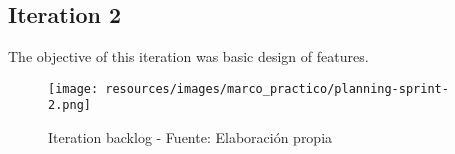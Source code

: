 \subsection{Iteration 2}
The objective of this iteration was basic design of features.

\begin{figure}[H]
    \centering
    \texttt{[image: resources/images/marco\_practico/planning-sprint-2.png]}
    \caption{Iteration backlog - Fuente: Elaboración propia}
    \label{fig:sprint2-backlog}
\end{figure}
